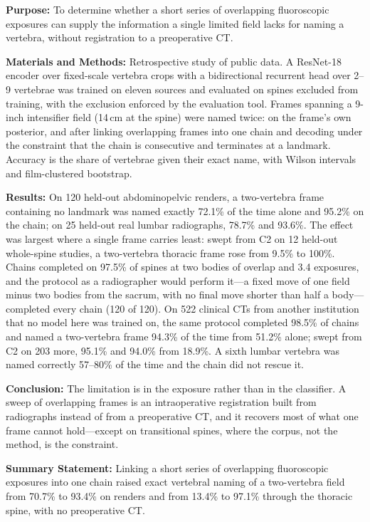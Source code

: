\documentclass[11pt,letterpaper]{article}
\begin{document}
\noindent\textbf{Purpose:} To determine whether a short series of overlapping fluoroscopic exposures can
supply the information a single limited field lacks for naming a vertebra, without registration to a
preoperative CT.

\noindent\textbf{Materials and Methods:} Retrospective study of public data. A ResNet-18 encoder over
fixed-scale vertebra crops with a bidirectional recurrent head over 2--9 vertebrae was trained on eleven
sources and evaluated on spines excluded from training, with the exclusion enforced by the evaluation tool.
Frames spanning a 9-inch intensifier field (14\,cm at the spine) were named twice: on the frame's own
posterior, and after linking overlapping frames into one chain and decoding under the constraint that the
chain is consecutive and terminates at a landmark. Accuracy is the share of vertebrae given their exact
name, with Wilson intervals and film-clustered bootstrap.

\noindent\textbf{Results:} On 120 held-out abdominopelvic renders, a two-vertebra frame containing no
landmark was named exactly 72.1\% of the time alone and 95.2\% on the chain; on 25 held-out real lumbar
radiographs, 78.7\% and 93.6\%. The effect was largest where a single frame carries least: swept from C2 on 12
held-out whole-spine studies, a two-vertebra thoracic frame rose from 9.5\% to 100\%. Chains completed on
97.5\% of spines at two bodies of overlap and 3.4 exposures, and the protocol as a radiographer would
perform it---a fixed move of one field minus two bodies from the sacrum, with no final move shorter than
half a body---completed every chain (120 of 120). On 522 clinical CTs from another institution that no
model here was trained on, the same protocol completed 98.5\% of chains and named a two-vertebra frame
94.3\% of the time from 51.2\% alone; swept from C2 on 203 more, 95.1\% and 94.0\% from 18.9\%. A sixth lumbar vertebra was named correctly 57--80\% of the
time and the chain did not rescue it.

\noindent\textbf{Conclusion:} The limitation is in the exposure rather than in the classifier. A sweep of
overlapping frames is an intraoperative registration built from radiographs instead of from a preoperative
CT, and it recovers most of what one frame cannot hold---except on transitional spines, where the corpus,
not the method, is the constraint.

\medskip
\noindent\textbf{Summary Statement:} Linking a short series of overlapping fluoroscopic exposures into one
chain raised exact vertebral naming of a two-vertebra field from 70.7\% to 93.4\% on renders and from 13.4\%
to 97.1\% through the thoracic spine, with no preoperative CT.
\end{document}
